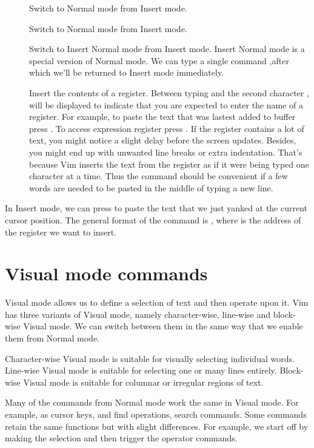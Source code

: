 \begin{description}
  \item[] Switch to Normal mode from Insert mode.
  \item[\syntax{<C-[>}] Switch to Normal mode from Insert mode.\vphantom{]}
  \item[] Switch to Insert Normal mode from Insert mode.
Insert Normal mode is a special version of Normal mode. We can type a single command ,after which we'll be returned to Insert mode immediately.
\item[] Insert the contents of a register.  Between typing  and the second character ,  will be displayed to indicate that you are expected to enter the name of a register. For example, to paste the text that was lastest added to buffer press . To access expression register press . If the register contains a lot of text, you might notice a slight delay before the screen updates. Besides, you might end up with unwanted line breaks or extra indentation. That's because Vim inserts the text from the register as if it were being typed one character at a time. Thus the command should be convenient if a few words are needed to be pasted in the middle of typing a new line.
  
\end{description}


In Insert mode, we can press  to paste the text that we just yanked at the current cursor position. The general format of the command is , where  is the address of the register we want to insert.

\section{Visual mode commands}
Visual mode allows us to define a selection of text and then operate upon it.
Vim has three variants of Visual mode, namely character-wise, line-wise and block-wise Visual mode. We can switch between them in the same way that we enable them from Normal mode.

Character-wise Visual mode is suitable for visually selecting individual words. Line-wise Visual mode is suitable for selecting one or many lines entirely. Block-wise Visual mode is suitable for columnar or irregular regions of text.

Many of the commands from Normal mode work the same in Visual mode.
For example,  as cursor keys,  and \syntax{;/,} find operations,  search commands.
Some commands retain the same functions but with slight differences.
For example, we start off by making the selection and then trigger the operator commands.

